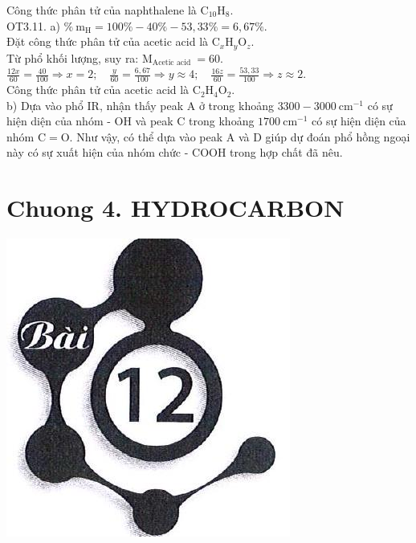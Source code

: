 \documentclass[10pt]{article}
\begin{document}
Công thức phân tử của naphthalene là $\mathrm{C}_{10} \mathrm{H}_{8}$.\\
OT3.11. a) $\% \mathrm{~m}_{\mathrm{H}}=100 \%-40 \%-53,33 \%=6,67 \%$.\\
Đặt công thức phân tử của acetic acid là $\mathrm{C}_{x} \mathrm{H}_{y} \mathrm{O}_{z}$.\\
Từ phổ khối lượng, suy ra: $\mathrm{M}_{\text {Acetic acid }}=60$.\\
$\frac{12 x}{60}=\frac{40}{100} \Rightarrow x=2 ; \quad \frac{y}{60}=\frac{6,67}{100} \Rightarrow y \approx 4 ; \quad \frac{16 z}{60}=\frac{53,33}{100} \Rightarrow z \approx 2$.\\
Công thức phân tử của acetic acid là $\mathrm{C}_{2} \mathrm{H}_{4} \mathrm{O}_{2}$.\\
b) Dựa vào phổ IR, nhận thấy peak A ở trong khoảng $3300-3000 \mathrm{~cm}^{-1}$ có sự hiện diện của nhóm - OH và peak C trong khoảng $1700 \mathrm{~cm}^{-1}$ có sự hiện diện của nhóm $\mathrm{C}=\mathrm{O}$. Như vậy, có thể dựa vào peak A và D giúp dự đoán phổ hồng ngoại này có sự xuất hiện của nhóm chức - COOH trong hợp chất đã nêu.

\section*{Chuong 4. HYDROCARBON}
\begin{center}
\includegraphics[max width=\textwidth]{2025_10_23_adad5b98d65ac6665838g-18}
\end{center}
\end{document}
